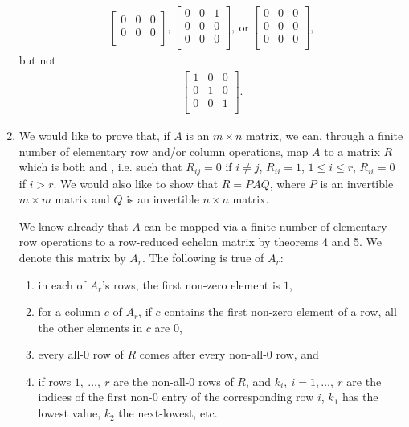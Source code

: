 \documentclass[12pt]{article}
\begin{document}
\begin{enumerate}
\begin{align*}
\begin{bmatrix}
        0 & 0 & 0\\
        0 & 0 & 0\\
      \end{bmatrix},
      \begin{bmatrix}
        0 & 0 & 1\\
        0 & 0 & 0\\
        0 & 0 & 0\\
      \end{bmatrix},\ \text{or}\
      \begin{bmatrix}
        0 & 0 & 0\\
        0 & 0 & 0\\
        0 & 0 & 0\\
      \end{bmatrix},
    \end{align*}
    but not
    \begin{align*}
      \begin{bmatrix}
        1 & 0 & 0\\
        0 & 1 & 0\\
        0 & 0 & 1\\
      \end{bmatrix}.
    \end{align*}

  \item
    We would like to prove that, if $A$ is an $m \times n$
    matrix, we can, through a finite number of elementary row
    and/or column operations, map $A$ to a matrix $R$ which is
    both  and , i.e. such that $R_{ij} = 0$ if $i \neq j$, $R_{ii}
    = 1$, $1 \leq i \leq r$, $R_{ii} = 0$ if $i > r$. We would
    also like to show that $R = PAQ$, where $P$ is an invertible
    $m \times m$ matrix and $Q$ is an invertible $n \times n$
    matrix.

    We know already that $A$ can be mapped via a finite number of
    elementary row operations to a row-reduced echelon matrix by
    theorems 4 and 5. We denote this matrix by $A_r$. The
    following is true of $A_r$:

    \begin{enumerate}
      \item
        in each of $A_r$'s rows, the first non-zero element is
        $1$,
      \item
        for a column $c$ of $A_r$, if $c$ contains the first
        non-zero element of a row, all the other elements in $c$
        are $0$,
      \item
        every all-0 row of $R$ comes after every non-all-0 row,
        and
      \item
        if rows $1,\ \ldots,\ r$ are the non-all-0 rows of $R$,
        and $k_i,\ i = 1, \ldots,\ r$ are the indices of the
        first non-0 entry of the corresponding row $i$, $k_1$ has
        the lowest value, $k_2$ the next-lowest, etc.
    \end{enumerate}


\end{enumerate}
\end{document}
